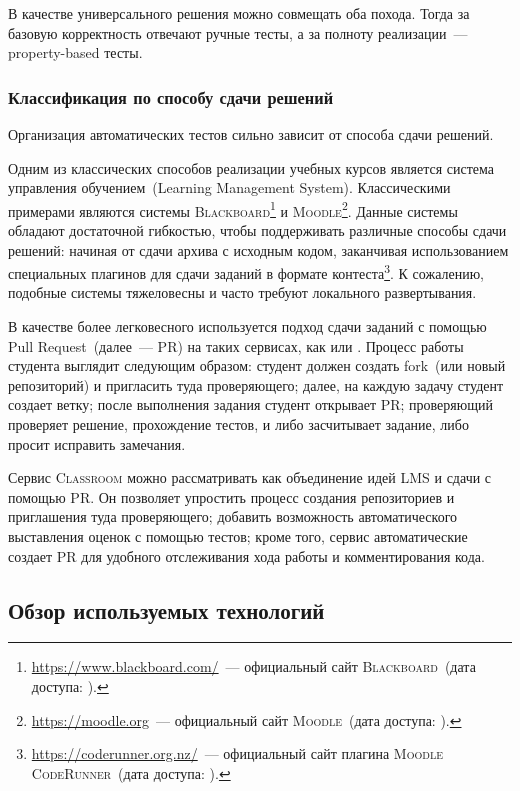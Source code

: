 В качестве универсального решения можно совмещать оба похода.
Тогда за базовую корректность отвечают ручные тесты, а за полноту реализации~--- property-based тесты.

\subsubsection{Классификация по способу сдачи решений}

Организация автоматических тестов сильно зависит от способа сдачи решений.

Одним из классических способов реализации учебных курсов является система управления обучением~(Learning Management System).
Классическими примерами являются системы \textsc{Blackboard}\footnote{\url{https://www.blackboard.com/}~--- официальный сайт \textsc{Blackboard}~(дата доступа: ).} и \textsc{Moodle}\footnote{\url{https://moodle.org}~--- официальный сайт \textsc{Moodle}~(дата доступа: ).}.
Данные системы обладают достаточной гибкостью, чтобы поддерживать различные способы сдачи решений: начиная от сдачи архива с исходным кодом, заканчивая использованием специальных плагинов для сдачи заданий в формате контеста\footnote{\url{https://coderunner.org.nz/}~--- официальный сайт плагина \textsc{Moodle CodeRunner}~(дата доступа: ).}.
К сожалению, подобные системы тяжеловесны и часто требуют локального развертывания.

В качестве более легковесного используется подход сдачи заданий с помощью Pull Request~(далее~--- PR) на таких сервисах, как \GitHub{} или \gitlab{}.
Процесс работы студента выглядит следующим образом: студент должен создать fork~(или новый репозиторий) и пригласить туда проверяющего; далее, на каждую задачу студент создает ветку; после выполнения задания студент открывает PR; проверяющий проверяет решение, прохождение тестов, и либо засчитывает задание, либо просит исправить замечания.

Сервис \GitHub{} \textsc{Classroom} можно рассматривать как объединение идей LMS и сдачи с помощью PR.
Он позволяет упростить процесс создания репозиториев и приглашения туда проверяющего; добавить возможность автоматического выставления оценок с помощью тестов; кроме того, сервис автоматические создает PR для удобного отслеживания хода работы и комментирования кода.


\subsection{Обзор используемых технологий}

